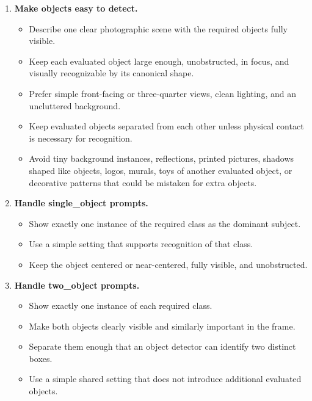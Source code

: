 \documentclass{llmxive}
\begin{document}
\begin{tcolorbox}
\begin{enumerate}[leftmargin=1.5em, itemsep=0.2em]
    \item \textbf{Make objects easy to detect.}
    \begin{itemize}[leftmargin=1.5em, nosep]
        \item Describe one clear photographic scene with the required objects fully visible.
        \item Keep each evaluated object large enough, unobstructed, in focus, and visually recognizable by its canonical shape.
        \item Prefer simple front-facing or three-quarter views, clean lighting, and an uncluttered background.
        \item Keep evaluated objects separated from each other unless physical contact is necessary for recognition.
        \item Avoid tiny background instances, reflections, printed pictures, shadows shaped like objects, logos, murals, toys of another evaluated object, or decorative patterns that could be mistaken for extra objects.
    \end{itemize}

    \item \textbf{Handle single\_object prompts.}
    \begin{itemize}[leftmargin=1.5em, nosep]
        \item Show exactly one instance of the required class as the dominant subject.
        \item Use a simple setting that supports recognition of that class.
        \item Keep the object centered or near-centered, fully visible, and unobstructed.
    \end{itemize}

    \item \textbf{Handle two\_object prompts.}
    \begin{itemize}[leftmargin=1.5em, nosep]
        \item Show exactly one instance of each required class.
        \item Make both objects clearly visible and similarly important in the frame.
        \item Separate them enough that an object detector can identify two distinct boxes.
        \item Use a simple shared setting that does not introduce additional evaluated objects.
    \end{itemize}


\end{enumerate}
\end{tcolorbox}
\end{document}
